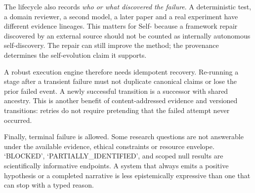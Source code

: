 The lifecycle also records \emph{who or what discovered the failure}. A deterministic test, a domain reviewer, a second model, a later paper and a real experiment have different evidence lineages. This matters for Self-\RAKL{} because a framework repair discovered by an external source should not be counted as internally autonomous self-discovery. The repair can still improve the method; the provenance determines the self-evolution claim it supports.

A robust execution engine therefore needs idempotent recovery. Re-running a stage after a transient failure must not duplicate canonical claims or lose the prior failed event. A newly successful transition is a successor with shared ancestry. This is another benefit of content-addressed evidence and versioned transitions: retries do not require pretending that the failed attempt never occurred.

Finally, terminal failure is allowed. Some research questions are not answerable under the available evidence, ethical constraints or resource envelope. `BLOCKED', `PARTIALLY\_IDENTIFIED', \CannotCheck{} and scoped null results are scientifically informative endpoints. A system that always emits a positive hypothesis or a completed narrative is less epistemically expressive than one that can stop with a typed reason.

